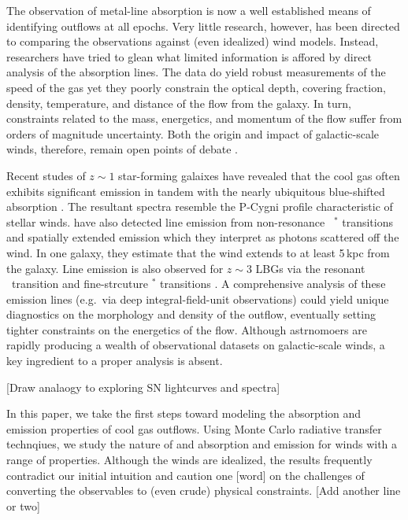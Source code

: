 \documentclass[12pt,preprint]{aastex}
\begin{document}
The observation of metal-line absorption is now a well established
means of identifying outflows at all epochs. Very little research,
however,  has been directed
to comparing the observations against (even idealized) wind
models.  Instead, researchers have tried to glean what limited information
is affored by direct analysis of the absorption lines.  The data do yield
robust measurements of the speed of the gas yet they poorly constrain the
optical depth, covering fraction, density, temperature, and distance
of the flow from the galaxy.   In turn, constraints related to the
mass, energetics, and momentum of the flow suffer from
orders of magnitude uncertainty.  Both the origin and impact of
galactic-scale winds, therefore, remain open points of debate
\citep{debate}.

Recent studes of $z \sim 1$ star-forming galaixes have revealed that
the cool gas often exhibits significant  emission in
tandem with the nearly ubiquitous blue-shifted absorption
\citep{wcp+09,rubin+10b}.  The resultant spectra resemble the P-Cygni
profile characteristic of stellar winds.
\cite{rubin+10a} have also detected line
emission from non-resonance ~$^*$ transitions and spatially
extended  emission which they interpret as 
photons scattered off the wind.  In one galaxy, they estimate that the
wind extends to at least 5\,kpc from the galaxy.  Line emission is
also observed for $z \sim 3$ LBGs via the resonant \lya\ transition
and fine-strcuture $^*$ transitions \citep{prs+02,shapley03}.
A comprehensive analysis of these emission lines
(e.g.\ via deep integral-field-unit observations) could yield unique
diagnostics on the morphology and density of the outflow, eventually
setting tighter constraints on the energetics of the flow.  
Although astrnomoers are rapidly producing a wealth of observational
datasets on galactic-scale winds, a key ingredient to a proper
analysis is absent.

[Draw analaogy to exploring SN lightcurves and spectra]

In this paper, we take the first steps toward modeling the absorption
and emission properties of cool gas outflows.  Using Monte Carlo
radiative transfer technqiues, we study the nature of  and
 absorption and emission for winds with a range of
properties.  Although the winds are idealized, the results frequently
contradict our initial intuition and caution one [word] on the
challenges of converting the observables to (even crude) physical
constraints.  [Add another line or two]
\end{document}
